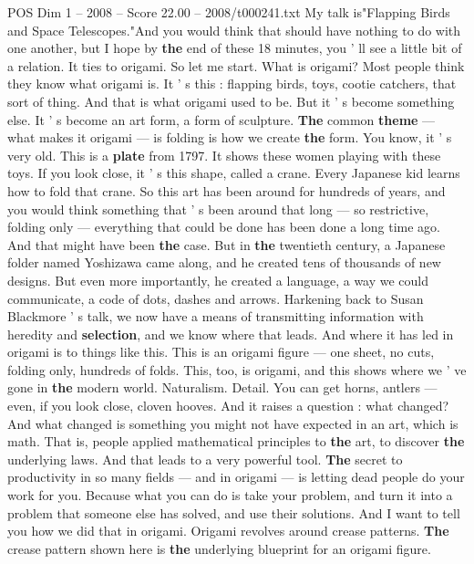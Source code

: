 \begin{textsample}{POS Dim 1 – 2008 – Score 22.00 – 2008/t000241.txt}  \label{ex:f1_pos_010}
My talk is"Flapping Birds and Space Telescopes."And you would think that should have nothing to do with one another, but I hope by \textbf{the} end of these 18 minutes, you ' ll see a little bit of a relation.
It ties to origami.
So let me start.
What is origami?
Most people think they know what origami is.
It ' s this : flapping birds, toys, cootie catchers, that sort of thing.
And that is what origami used to be.
But it ' s become something else.
It ' s become an art form, a form of sculpture. \textbf{The} common \textbf{theme} — what makes it origami — is folding is how we create \textbf{the} form.
You know, it ' s very old.
This is a \textbf{plate} from 1797.
It shows these women playing with these toys.
If you look close, it ' s this shape, called a crane.
Every Japanese kid learns how to fold that crane.
So this art has been around for hundreds of years, and you would think something that ' s been around that long — so restrictive, folding only — everything that could be done has been done a long time ago.
And that might have been \textbf{the} case.
But in \textbf{the} twentieth century, a Japanese folder named Yoshizawa came along, and he created tens of thousands of new designs.
But even more importantly, he created a language, a way we could communicate, a code of dots, dashes and arrows.
Harkening back to Susan Blackmore ' s talk, we now have a means of transmitting information with heredity and \textbf{selection}, and we know where that leads.
And where it has led in origami is to things like this.
This is an origami figure — one sheet, no cuts, folding only, hundreds of folds.
This, too, is origami, and this shows where we ' ve gone in \textbf{the} modern world.
Naturalism.
Detail.
You can get horns, antlers — even, if you look close, cloven hooves.
And it raises a question : what changed?
And what changed is something you might not have expected in an art, which is math.
That is, people applied mathematical principles to \textbf{the} art, to discover \textbf{the} underlying laws.
And that leads to a very powerful tool. \textbf{The} secret to productivity in so many fields — and in origami — is letting dead people do your work for you.
Because what you can do is take your problem, and turn it into a problem that someone else has solved, and use their solutions.
And I want to tell you how we did that in origami.
Origami revolves around crease patterns. \textbf{The} crease pattern shown here is \textbf{the} underlying blueprint for an origami figure.

\end{textsample}
